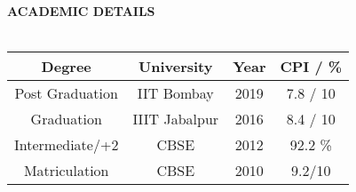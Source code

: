 \documentclass[a4paper,10pt]{article}
\newcommand{\lsep}{-0.5cm}
\begin{document}
{\textbf{\large{ACADEMIC DETAILS}}}\\[\lsep]
\\[0.2cm]
\indent \begin{tabular*}{\textwidth}{@{\extracolsep{\fill}}cccc}
\hline
\textbf{Degree}	&	\textbf{University}			&	\textbf{Year}	&	\textbf{CPI / \%}	\\
\hline
Post Graduation	&	IIT Bombay			&  2019	& 7.8 / 10		\\[0.15cm]
Graduation	&	IIIT Jabalpur	& 2016	& 8.4 / 10		\\[0.15cm]
Intermediate/+2		&	CBSE				&  2012	 &	92.2 \%		\\[0.15cm]
Matriculation		&	CBSE					& 2010	&	9.2/10		\\
\hline
\end{tabular*}
\\ \\
\end{document}
